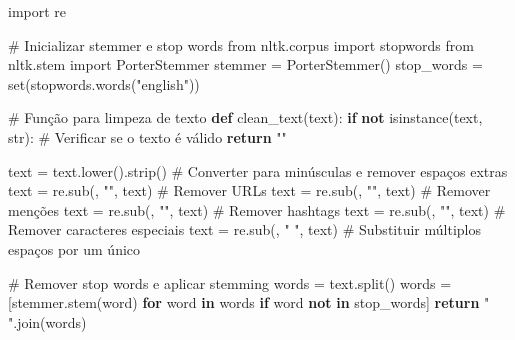 \documentclass[
  letterpaper,
  DIV=11,
  numbers=noendperiod]{scrartcl}
\newenvironment{Shaded}{\begin{snugshade}}{\end{snugshade}}
\newcommand{\BuiltInTok}[1]{\textcolor[rgb]{0.00,0.23,0.31}{#1}}
\newcommand{\CommentTok}[1]{\textcolor[rgb]{0.37,0.37,0.37}{#1}}
\newcommand{\ControlFlowTok}[1]{\textcolor[rgb]{0.00,0.23,0.31}{\textbf{#1}}}
\newcommand{\ImportTok}[1]{\textcolor[rgb]{0.00,0.46,0.62}{#1}}
\newcommand{\KeywordTok}[1]{\textcolor[rgb]{0.00,0.23,0.31}{\textbf{#1}}}
\newcommand{\NormalTok}[1]{\textcolor[rgb]{0.00,0.23,0.31}{#1}}
\newcommand{\OperatorTok}[1]{\textcolor[rgb]{0.37,0.37,0.37}{#1}}
\newcommand{\StringTok}[1]{\textcolor[rgb]{0.13,0.47,0.30}{#1}}
\begin{document}
\begin{Shaded}
\begin{Highlighting}[]
\ImportTok{import}\NormalTok{ re}

\CommentTok{\# Inicializar stemmer e stop words}
\ImportTok{from}\NormalTok{ nltk.corpus }\ImportTok{import}\NormalTok{ stopwords}
\ImportTok{from}\NormalTok{ nltk.stem }\ImportTok{import}\NormalTok{ PorterStemmer}
\NormalTok{stemmer }\OperatorTok{=}\NormalTok{ PorterStemmer()}
\NormalTok{stop\_words }\OperatorTok{=} \BuiltInTok{set}\NormalTok{(stopwords.words(}\StringTok{"english"}\NormalTok{))}

\CommentTok{\# Função para limpeza de texto}
\KeywordTok{def}\NormalTok{ clean\_text(text):}
    \ControlFlowTok{if} \KeywordTok{not} \BuiltInTok{isinstance}\NormalTok{(text, }\BuiltInTok{str}\NormalTok{):  }\CommentTok{\# Verificar se o texto é válido}
        \ControlFlowTok{return} \StringTok{""}
    
\NormalTok{    text }\OperatorTok{=}\NormalTok{ text.lower().strip()  }\CommentTok{\# Converter para minúsculas e remover espaços extras}
\NormalTok{    text }\OperatorTok{=}\NormalTok{ re.sub(}\NormalTok{, }\StringTok{""}\NormalTok{, text)  }\CommentTok{\# Remover URLs}
\NormalTok{    text }\OperatorTok{=}\NormalTok{ re.sub(}\NormalTok{, }\StringTok{""}\NormalTok{, text)  }\CommentTok{\# Remover menções}
\NormalTok{    text }\OperatorTok{=}\NormalTok{ re.sub(}\NormalTok{, }\StringTok{""}\NormalTok{, text)  }\CommentTok{\# Remover hashtags}
\NormalTok{    text }\OperatorTok{=}\NormalTok{ re.sub(}\NormalTok{, }\StringTok{""}\NormalTok{, text)  }\CommentTok{\# Remover caracteres especiais}
\NormalTok{    text }\OperatorTok{=}\NormalTok{ re.sub(}\NormalTok{, }\StringTok{" "}\NormalTok{, text)  }\CommentTok{\# Substituir múltiplos espaços por um único}
    
    \CommentTok{\# Remover stop words e aplicar stemming}
\NormalTok{    words }\OperatorTok{=}\NormalTok{ text.split()}
\NormalTok{    words }\OperatorTok{=}\NormalTok{ [stemmer.stem(word) }\ControlFlowTok{for}\NormalTok{ word }\KeywordTok{in}\NormalTok{ words }\ControlFlowTok{if}\NormalTok{ word }\KeywordTok{not} \KeywordTok{in}\NormalTok{ stop\_words]}
    \ControlFlowTok{return} \StringTok{" "}\NormalTok{.join(words)}


\end{Highlighting}
\end{Shaded}
\end{document}
